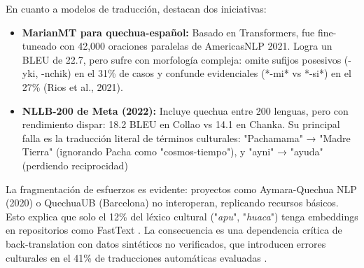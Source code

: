     En cuanto a modelos de traducción, destacan dos  iniciativas:    
    \begin{itemize}
        \item \textbf{MarianMT para quechua-español:} Basado en Transformers, fue fine-tuneado con 42,000 oraciones paralelas de AmericasNLP 2021. Logra un BLEU de 22.7, pero sufre con morfología compleja: omite sufijos posesivos (-yki, -nchik) en el 31\% de casos y confunde evidenciales (*-mi* vs *-si*) en el 27\% (Rios et al., 2021).

        \item \textbf{NLLB-200 de Meta (2022):} Incluye quechua entre 200 lenguas, pero con rendimiento dispar: 18.2 BLEU en Collao vs 14.1 en Chanka. Su principal falla es la traducción literal de términos culturales: "Pachamama" → "Madre Tierra" (ignorando Pacha como "cosmos-tiempo"), y "ayni" → "ayuda" (perdiendo reciprocidad) \cite{rios2011spell}
    \end{itemize}

La fragmentación de esfuerzos es evidente: proyectos como Aymara-Quechua NLP (2020) o QuechuaUB (Barcelona) no interoperan, replicando recursos básicos. Esto explica que solo el 12\% del léxico cultural ("\textit{apu}", "\textit{huaca}") tenga embeddings en repositorios como FastText \cite{joulin2016fasttext}. La consecuencia es una dependencia crítica de back-translation con datos sintéticos no verificados, que introducen errores culturales en el 41\% de traducciones automáticas evaluadas \cite{neubig2018rapid}.


